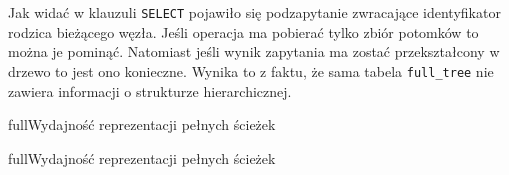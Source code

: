 Jak widać w klauzuli \texttt{SELECT} pojawiło się podzapytanie
zwracające identyfikator rodzica bieżącego węzła.
Jeśli operacja ma pobierać tylko zbiór potomków to można je pominąć.
Natomiast jeśli wynik zapytania ma zostać przekształcony w drzewo to jest ono konieczne.
Wynika to z faktu, że sama tabela \verb|full_tree| nie zawiera informacji o strukturze hierarchicznej.

%
%
%



\begin{qxtab}{full}{Wydajność reprezentacji pełnych ścieżek}
\end{qxtab}

\begin{qxfig}{full}{Wydajność reprezentacji pełnych ścieżek}
\end{qxfig}







